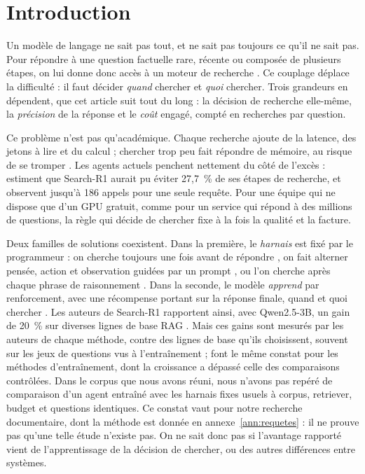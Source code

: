 \section{Introduction}

Un modèle de langage ne sait pas tout, et ne sait pas toujours ce qu'il ne sait pas. Pour répondre à une question factuelle rare, récente ou composée de plusieurs étapes, on lui donne donc accès à un moteur de recherche \citep{lewis2020retrieval}. Ce couplage déplace la difficulté : il faut décider \emph{quand} chercher et \emph{quoi} chercher. Trois grandeurs en dépendent, que cet article suit tout du long : la décision de recherche elle-même, la \emph{précision} de la réponse et le \emph{coût} engagé, compté en recherches par question.

Ce problème n'est pas qu'académique. Chaque recherche ajoute de la latence, des jetons à lire et du calcul ; chercher trop peu fait répondre de mémoire, au risque de se tromper \citep{mallen2022when}. Les agents actuels penchent nettement du côté de l'excès : \citet{wu2025search} estiment que Search-R1 aurait pu éviter 27,7~\% de ses étapes de recherche, et \citet{pezzuti2026how} observent jusqu'à 186 appels pour une seule requête. Pour une équipe qui ne dispose que d'un GPU gratuit, comme pour un service qui répond à des millions de questions, la règle qui décide de chercher fixe à la fois la qualité et la facture.

Deux familles de solutions coexistent. Dans la première, le \emph{harnais} est fixé par le programmeur : on cherche toujours une fois avant de répondre \citep{lewis2020retrieval}, on fait alterner pensée, action et observation guidées par un prompt \citep{yao2022react}, ou l'on cherche après chaque phrase de raisonnement \citep{trivedi2022interleaving}. Dans la seconde, le modèle \emph{apprend} par renforcement, avec une récompense portant sur la réponse finale, quand et quoi chercher \citep{jin2025search,song2025r1,chen2025research}. Les auteurs de Search-R1 rapportent ainsi, avec Qwen2.5-3B, un gain de 20~\% sur diverses lignes de base RAG \citep{jin2025search}. Mais ces gains sont mesurés par les auteurs de chaque méthode, contre des lignes de base qu'ils choisissent, souvent sur les jeux de questions vus à l'entraînement ; \citet{zhao2026retrieval} font le même constat pour les méthodes d'entraînement, dont la croissance a dépassé celle des comparaisons contrôlées. Dans le corpus que nous avons réuni, nous n'avons pas repéré de comparaison d'un agent entraîné avec les harnais fixes usuels à corpus, retriever, budget et questions identiques. Ce constat vaut pour notre recherche documentaire, dont la méthode est donnée en annexe~\ref{ann:requetes} : il ne prouve pas qu'une telle étude n'existe pas. On ne sait donc pas si l'avantage rapporté vient de l'apprentissage de la décision de chercher, ou des autres différences entre systèmes.

